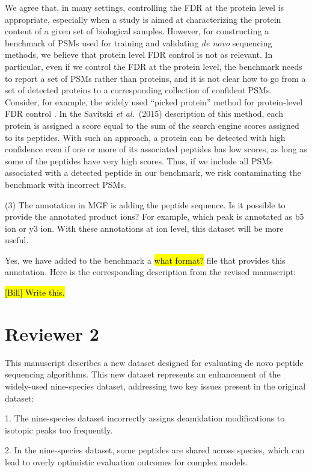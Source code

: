 \documentclass{article}
\newcommand{\response}[1]{\vspace*{1ex} \color{blue} \noindent #1 \color{black}
	\vspace*{2ex}}
\newcommand{\fixme}[1]{\hl{#1}}
\begin{document}
\response{We agree that, in many settings, controlling the FDR at the protein level is appropriate, especially when a study is aimed at characterizing the protein content of a given set of biological samples.
  However, for constructing a benchmark of PSMs used for training and validating \textit{de novo} sequencing methods, we believe that protein level FDR control is not as relevant.
  In particular, even if we control the FDR at the protein level, the benchmark needs to report a set of PSMs rather than proteins, and it is not clear how to go from a set of detected proteins to a corresponding collection of confident PSMs.
  Consider, for example, the widely used ``picked protein'' method for protein-level FDR control \cite{savitski2015scalable}.
  In the Savitski \textit{et al.}\ (2015) description of this method, each protein is assigned a score equal to the sum of the search engine scores assigned to its peptides.
  With such an approach, a protein can be detected with high confidence even if one or more of its associated peptides has low scores, as long as some of the peptides have very high scores.
  Thus, if we include all PSMs associated with a detected peptide in our benchmark, we risk contaminating the benchmark with incorrect PSMs.}

(3) The annotation in MGF is adding the peptide sequence. Is it possible to provide the annotated product ions? For example, which peak is annotated as b5 ion or y3 ion. With these annotations at ion level, this dataset will be more useful.

\response{Yes, we have added to the benchmark a \fixme{what format?} file that provides this annotation.  Here is the corresponding description from the revised manuscript:}

\fixme{[Bill] Write this.}

\clearpage
\section*{Reviewer 2}

This manuscript describes a new dataset designed for evaluating de novo peptide sequencing algorithms. This new dataset represents an enhancement of the widely-used nine-species dataset, addressing two key issues present in the original dataset:

1. The nine-species dataset incorrectly assigns deamidation modifications to isotopic peaks too frequently.

2. In the nine-species dataset, some peptides are shared across species, which can lead to overly optimistic evaluation outcomes for complex models.
\end{document}
